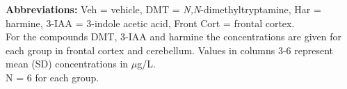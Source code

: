 \documentclass[tikz,crop,convert={density=400,outext=.png}]{standalone}
\begin{document}
\begin{table}
\begin{threeparttable}
\robustify\bfseries

    \begin{tablenotes}
      \item\footnotesize{\textbf{Abbreviations:} Veh =  vehicle, DMT = \textit{N,N}-dimethyltryptamine, Har = harmine, 3-IAA = 3-indole acetic acid, Front Cort = frontal cortex. \\
For the compounds DMT, 3-IAA and harmine the concentrations are given for each group in  frontal cortex and cerebellum. Values in columns 3-6 represent mean (SD) concentrations in $\mu$g/L.  \\N = 6 for each group.}
    \end{tablenotes}
  \end{threeparttable}
\end{table}
\end{document}
